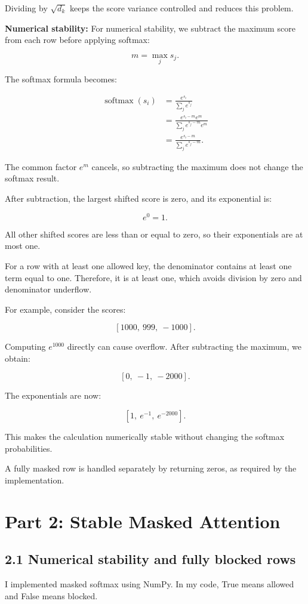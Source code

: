 \documentclass[11pt]{article}
\begin{document}
Dividing by $\sqrt{d_k}$ keeps the score variance
controlled and reduces this problem.

\textbf{Numerical stability:} For numerical stability, we subtract the maximum
score from each row before applying softmax:

\[
m=\max_j s_j.
\]

The softmax formula becomes:

\[
\begin{aligned}
\operatorname{softmax}(s_i)
&=\frac{e^{s_i}}{\sum_j e^{s_j}}\\
&=\frac{e^{s_i-m}e^m}
{\sum_j e^{s_j-m}e^m}\\
&=\frac{e^{s_i-m}}{\sum_j e^{s_j-m}}.
\end{aligned}
\]

The common factor $e^m$ cancels, so subtracting
the maximum does not change the softmax result.

After subtraction, the largest shifted score is
zero, and its exponential is:

\[
e^0=1.
\]

All other shifted scores are less than or equal
to zero, so their exponentials are at most one.

For a row with at least one allowed key, the
denominator contains at least one term equal to
one. Therefore, it is at least one, which avoids
division by zero and denominator underflow.

For example, consider the scores:

\[
[1000,\ 999,\ -1000].
\]

Computing $e^{1000}$ directly can cause overflow.
After subtracting the maximum, we obtain:

\[
[0,\ -1,\ -2000].
\]

The exponentials are now:

\[
[1,\ e^{-1},\ e^{-2000}].
\]

This makes the calculation numerically stable
without changing the softmax probabilities.

A fully masked row is handled separately by
returning zeros, as required by the implementation.
\section*{Part 2: Stable Masked Attention}
\subsection*{2.1 Numerical stability and fully blocked rows}
I implemented masked softmax using NumPy.
In my code, True means allowed and False means blocked.
\end{document}
